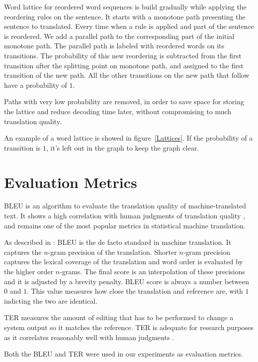 Word lattice for reordered word sequences is build gradually while applying the reordering rules on the sentence. It starts with a monotone path presenting the sentence to translated. Every time when a rule is applied and part of the sentence is reordered. We add a parallel path to the corresponding part of the initial monotone path. The parallel path is labeled with reordered words on its transitions. The probability of this new reordering is subtracted from the first transition after the splitting point on monotone path, and assigned to the first transition of the new path. All the other transitions on the new path that follow have a probability of $1$.

Paths with very low probability are removed, in order to save space for storing the lattice and reduce decoding time later, without compromising to much translation quality. 

An example of a word lattice is showed in figure~\ref{Lattices}. If the probability of a transition is $1$, it's left out in the graph to keep the graph clear.

\section{Evaluation Metrics}
\label{ch:Foundations:sec:bleu}

\ac{BLEU} is an algorithm to evaluate the translation quality of machine-translated text. It shows a high correlation with human judgments of translation quality \citep{bleuscore}, and remains one of the most popular metrics in statistical machine translation.

As described in \cite{metrics}: \ac{BLEU} is the de facto standard in machine translation. It captures the $n$-gram precision of the translation. Shorter $n$-gram precision captures the lexical coverage of the translation and word order is evaluated by the higher order $n$-grams. The final score is an interpolation of these precisions and it is adjusted by a brevity penalty. \ac{BLEU} score is always a number between $0$ and $1$. This value measures how close the translation and reference are, with $1$ indicting the two are identical.

\ac{TER} measures the amount of editing that has to be performed to change a system output so it matches the reference. \ac{TER} is adequate for research purposes as it correlates reasonably well with human judgments \citep{snover2006study}.

Both the \ac{BLEU} and \ac{TER} were used in our experiments as evaluation metrics.

